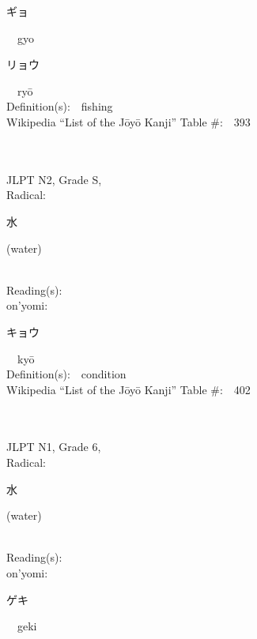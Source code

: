 \begin{multicols}{2}
{\hspace*{2em}}{\begin{CJK}{UTF8}{min} ギョ \end{CJK}}\ \ gyo\ \ \\
{\hspace*{2em}}{\begin{CJK}{UTF8}{min} リョウ \end{CJK}}\ \ ry\=o\ \ \\
Definition(s):\ \ fishing \\
Wikipedia ``List of the J\=oy\=o Kanji'' Table \#:\ \ 393 \\
\ \ \\
{\fontsize{34pt}{40pt}  }\ \ \\  %
{JLPT N2, Grade S, \\Radical:\ \ {\begin{CJK}{UTF8}{min} 水 \end{CJK}} (water) } \\
Reading(s):\ \ \\
{\hspace*{1em}}on'yomi:\ \ \\
{\hspace*{2em}}{\begin{CJK}{UTF8}{min} キョウ \end{CJK}}\ \ ky\=o\ \ \\
Definition(s):\ \ condition \\
Wikipedia ``List of the J\=oy\=o Kanji'' Table \#:\ \ 402 \\
\ \ \\
{\fontsize{34pt}{40pt}  }\ \ \\  %
{JLPT N1, Grade 6, \\Radical:\ \ {\begin{CJK}{UTF8}{min} 水 \end{CJK}} (water) } \\
Reading(s):\ \ \\
{\hspace*{1em}}on'yomi:\ \ \\
{\hspace*{2em}}{\begin{CJK}{UTF8}{min} ゲキ \end{CJK}}\ \ geki\ \ \\

\end{multicols}
